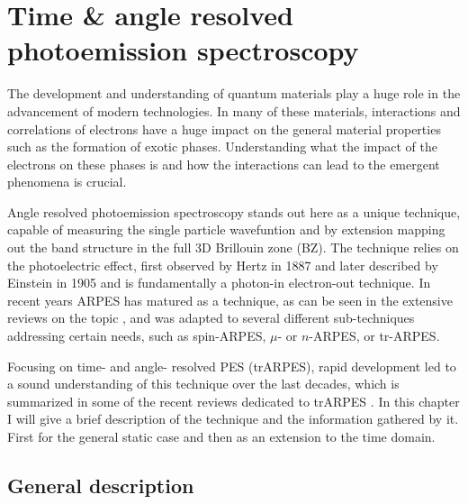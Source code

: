 \chapter{Time \& angle resolved photoemission spectroscopy}

The development and understanding of quantum materials play a huge role in the advancement of modern technologies.
In many of these materials, interactions and correlations of electrons have a huge impact on the general material properties such as the formation of exotic phases.
Understanding what the impact of the electrons on these phases is and how the interactions can lead to the emergent phenomena is crucial.

Angle resolved photoemission spectroscopy stands out here as a unique technique, capable of measuring the single particle wavefuntion and by extension mapping out the band structure in the full 3D Brillouin zone (BZ).
The technique relies on the photoelectric effect, first observed by Hertz in 1887 and later described by Einstein in 1905 and is fundamentally a photon-in electron-out technique.
In recent years ARPES has matured as a technique, as can be seen in the extensive reviews on the topic \cite{}, and was adapted to several different sub-techniques addressing certain needs, such as spin-ARPES, $\mu$- or $n$-ARPES, or tr-ARPES.

Focusing on time- and angle- resolved PES (trARPES), rapid development led to a sound understanding of this technique over the last decades, which is summarized in some of the recent reviews dedicated to trARPES \cite{}.
In this chapter I will give a brief description of the technique and the information gathered by it.
First for the general static case and then as an extension to the time domain.

\section{General description}

